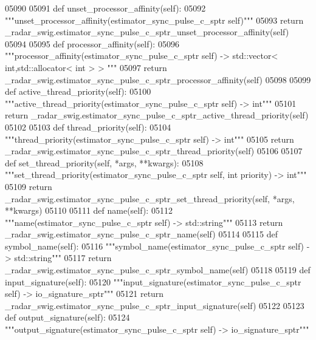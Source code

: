 \begin{DoxyCode}
{{{{{{{{{{{{{{{{{05090 
05091     \textcolor{keyword}{def }unset_processor_affinity(self):
05092         \textcolor{stringliteral}{"""unset\_processor\_affinity(estimator\_sync\_pulse\_c\_sptr self)"""}
05093         \textcolor{keywordflow}{return} \_radar\_swig.estimator\_sync\_pulse\_c\_sptr\_unset\_processor\_affinity(self)
05094 
05095     \textcolor{keyword}{def }processor_affinity(self):
05096         \textcolor{stringliteral}{"""processor\_affinity(estimator\_sync\_pulse\_c\_sptr self) -> std::vector< int,std::allocator< int > >
      """}
05097         \textcolor{keywordflow}{return} \_radar\_swig.estimator\_sync\_pulse\_c\_sptr\_processor\_affinity(self)
05098 
05099     \textcolor{keyword}{def }active_thread_priority(self):
05100         \textcolor{stringliteral}{"""active\_thread\_priority(estimator\_sync\_pulse\_c\_sptr self) -> int"""}
05101         \textcolor{keywordflow}{return} \_radar\_swig.estimator\_sync\_pulse\_c\_sptr\_active\_thread\_priority(self)
05102 
05103     \textcolor{keyword}{def }thread_priority(self):
05104         \textcolor{stringliteral}{"""thread\_priority(estimator\_sync\_pulse\_c\_sptr self) -> int"""}
05105         \textcolor{keywordflow}{return} \_radar\_swig.estimator\_sync\_pulse\_c\_sptr\_thread\_priority(self)
05106 
05107     \textcolor{keyword}{def }set_thread_priority(self, *args, **kwargs):
05108         \textcolor{stringliteral}{"""set\_thread\_priority(estimator\_sync\_pulse\_c\_sptr self, int priority) -> int"""}
05109         \textcolor{keywordflow}{return} \_radar\_swig.estimator\_sync\_pulse\_c\_sptr\_set\_thread\_priority(self, *args, **kwargs)
05110 
05111     \textcolor{keyword}{def }name(self):
05112         \textcolor{stringliteral}{"""name(estimator\_sync\_pulse\_c\_sptr self) -> std::string"""}
05113         \textcolor{keywordflow}{return} \_radar\_swig.estimator\_sync\_pulse\_c\_sptr\_name(self)
05114 
05115     \textcolor{keyword}{def }symbol_name(self):
05116         \textcolor{stringliteral}{"""symbol\_name(estimator\_sync\_pulse\_c\_sptr self) -> std::string"""}
05117         \textcolor{keywordflow}{return} \_radar\_swig.estimator\_sync\_pulse\_c\_sptr\_symbol\_name(self)
05118 
05119     \textcolor{keyword}{def }input_signature(self):
05120         \textcolor{stringliteral}{"""input\_signature(estimator\_sync\_pulse\_c\_sptr self) -> io\_signature\_sptr"""}
05121         \textcolor{keywordflow}{return} \_radar\_swig.estimator\_sync\_pulse\_c\_sptr\_input\_signature(self)
05122 
05123     \textcolor{keyword}{def }output_signature(self):
05124         \textcolor{stringliteral}{"""output\_signature(estimator\_sync\_pulse\_c\_sptr self) -> io\_signature\_sptr"""}
}}}}}}}}}}}}}}}}}
\end{DoxyCode}
